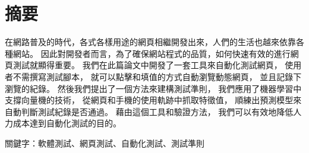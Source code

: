 \newcommand{\eng}[1]{\ \raisebox{1pt}{#1}}

\chapter{摘要}

\setlength{\parindent}{2em}
在網路普及的時代，各式各樣用途的網頁相繼開發出來，人們的生活也越來依靠各種網站。
因此對開發者而言，為了確保網站程式的品質，如何快速有效的進行網頁測試就顯得重要。
我們在此篇論文中開發了一套工具來自動化測試網頁，
使用者不需撰寫測試腳本，
就可以點擊和填值的方式自動瀏覽動態網頁，
並且記錄下瀏覽的紀錄。
然後我們提出了一個方法來建構測試準則，
我們應用了機器學習中支撐向量機的技術，
從網頁和手機的使用軌跡中抓取特徵值，
順練出預測模型來自動判斷測試紀錄是否通過。
藉由這個工具和驗證方法，
我們可以有效地降低人力成本達到自動化測試的目的。

\;\;
關鍵字：軟體測試、網頁測試、自動化測試、測試準則
